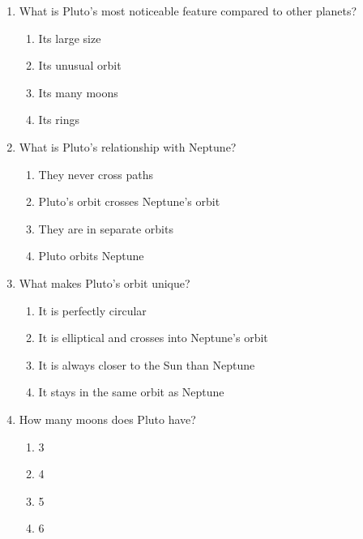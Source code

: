 \documentclass[12pt]{article}
\begin{document}
\begin{enumerate}
    \vspace{0.5cm}

    \item What is Pluto's most noticeable feature compared to other planets?

    \begin{enumerate}[label=\Alph*.]
        \item Its large size
        \item Its unusual orbit
        \item Its many moons
        \item Its rings
    \end{enumerate}
    
    \vspace{0.5cm}

    \item What is Pluto's relationship with Neptune?

    \begin{enumerate}[label=\Alph*.]
        \item They never cross paths
        \item Pluto's orbit crosses Neptune's orbit
        \item They are in separate orbits
        \item Pluto orbits Neptune
    \end{enumerate}
    
    \vspace{0.5cm}

    \item What makes Pluto’s orbit unique?

    \begin{enumerate}[label=\Alph*.]
        \item It is perfectly circular
        \item It is elliptical and crosses into Neptune’s orbit
        \item It is always closer to the Sun than Neptune
        \item It stays in the same orbit as Neptune
    \end{enumerate}
    
    \vspace{0.5cm}

    \item How many moons does Pluto have?

    \begin{enumerate}[label=\Alph*.]
        \item 3
        \item 4
        \item 5
        \item 6
    \end{enumerate}
    

\end{enumerate}
\end{document}

